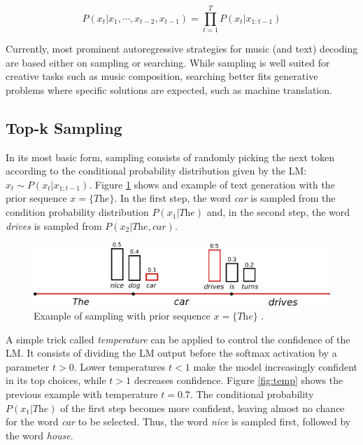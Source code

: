 \begin{equation} \label{eq:autoregressive}
    P(x_t|x_1, \cdots, x_{t-2}, x_{t-1}) = \prod_{t=1}^{T} P(x_t|x_{1:t-1})
\end{equation}

Currently, most prominent autoregressive strategies for music (and text) decoding are based either on sampling or searching. While sampling is well suited for creative tasks such as music composition, searching better fits generative problems where specific solutions are expected, such as machine translation.

\subsection{Top-k Sampling}

In its most basic form, sampling consists of randomly picking the next token according to the conditional probability distribution given by the LM: $x_t \sim P(x_t|x_{1:t-1})$. Figure \ref{fig:topk} shows and example of text generation with the prior sequence $x = \{\textit{The}\}$. In the first step, the word \textit{car} is sampled from the condition probability distribution $P(x_1 | \textit{The})$ and, in the second step, the word \textit{drives} is sampled from $P(x_2 | \textit{The}, \textit{car})$.

\begin{figure}[!h]
 \centering
 \includegraphics[width=0.9\columnwidth]{imgs/background/sampling.png}
 \caption{Example of sampling with prior sequence $x = \{\textit{The}\}$ \cite{platen2020}.}
 \label{fig:topk}
\end{figure}

A simple trick called \textit{temperature} can be applied to control the confidence of the LM. It consists of dividing the LM output before the softmax activation by a parameter $t > 0$. Lower temperatures $t < 1$ make the model increasingly confident in its top choices, while $t > 1$ decreases confidence. Figure \ref{fig:temp} shows the previous example with temperature $t = 0.7$. The conditional probability $P(x_1 | \textit{The})$ of the first step becomes more confident, leaving almost no chance for the word \textit{car} to be selected. Thus, the word \textit{nice} is sampled first, followed by the word \textit{house}.

